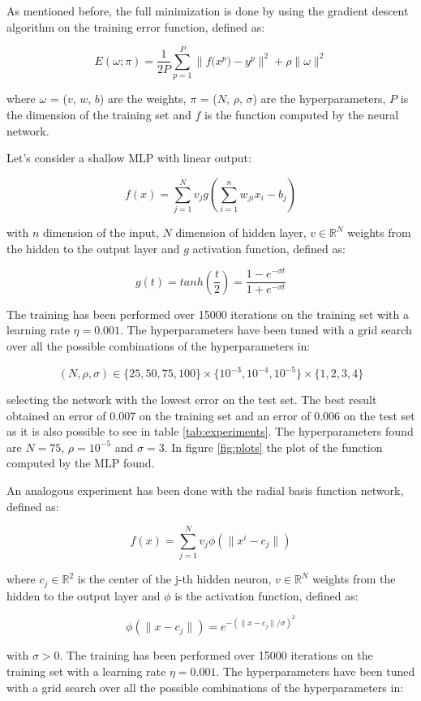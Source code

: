 \documentclass[a4paper]{article}
\numberwithin{equation}{section} %
\numberwithin{figure}{section} %
\numberwithin{table}{section} %
\theoremstyle{definition}
\begin{document}
As mentioned before, the full minimization is done by using the gradient
descent algorithm on the training error function, defined as:

\[ E(\omega; \pi) = \frac{1}{2P} \displaystyle\sum_{p=1}^{P} \| f\big(x^p\big) - y^p \|^2
+ \rho \| \omega \|^2 \]

\noindent where $\omega$ = ($v$, $w$, $b$) are the weights,
$\pi$ = ($N$, $\rho$, $\sigma$) are the hyperparameters, $P$ is the dimension
of the training set and $f$ is the function computed by the neural network.

Let's consider a shallow MLP with linear output:

\[ f(x) = \displaystyle\sum_{j=1}^{N} v_j g\left(\displaystyle\sum_{i=1}^{n}w_{ji}x_i - b_j\right) \]

\noindent with $n$ dimension of the input, $N$ dimension of hidden layer, $v \in \mathbb{R}^N$
weights from the hidden to the output layer and
$g$ activation function, defined as:

\[ g(t) = tanh\left(\frac{t}{2}\right) = \frac{1-e^{-\sigma t}}{1+e^{-\sigma t}} \]

The training has been performed over 15000 iterations on the training set with
a learning rate $\eta = 0.001$. The hyperparameters have been tuned with a
grid search over all the possible combinations of the hyperparameters in:

\[ (N, \rho, \sigma) \in \Big\{25, 50, 75, 100\Big\} \times \Big\{10^{-3}, 10^{-4}, 10^{-5}\Big\}
\times \Big\{1, 2, 3, 4\Big\} \]

\noindent selecting the network with the lowest error on the test set.
The best result obtained an error of 0.007 on the training set and an error of
0.006 on the test set as it is also possible to see in table \ref{tab:experiments}.
The hyperparameters found are $N=75$, $\rho=10^{-5}$ and $\sigma=3$. In figure \ref{fig:plots}
the plot of the function computed by the MLP found.

An analogous experiment has been done with the radial basis function network,
defined as:

\[ f(x) = \displaystyle\sum_{j=1}^{N} v_j \phi(\| x^i - c_j \|) \]

where $c_j \in \mathbb{R}^2$ is the center of the j-th hidden neuron,
$v \in \mathbb{R}^N$ weights from the hidden to the output layer and $\phi$
is the activation function, defined as:

\[ \phi(\|x - c_j\|) = e^{-(\| x - c_j \|/\sigma)^2} \]

\noindent with $\sigma > 0$.
The training has been performed over 15000 iterations on the training set with
a learning rate $\eta = 0.001$. The hyperparameters have been tuned with a
grid search over all the possible combinations of the hyperparameters in:
\end{document}
